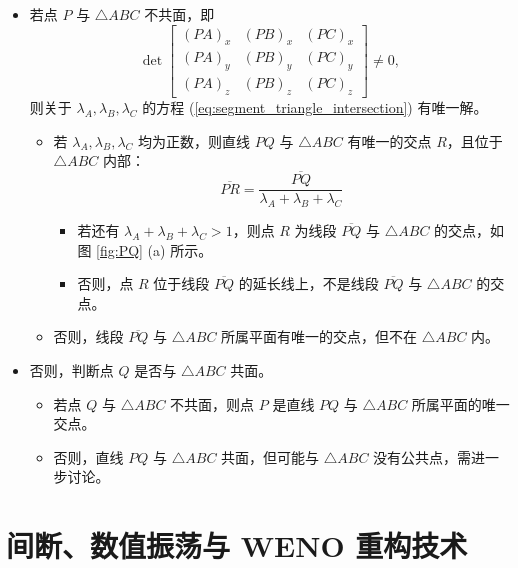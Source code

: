 \begin{itemize}
\item 若点 $P$ 与 $\triangle ABC$ 不共面，即
\begin{equation}
\det\begin{bmatrix}(PA)_{x} & (PB)_{x} & (PC)_{x}\\
(PA)_{y} & (PB)_{y} & (PC)_{y}\\
(PA)_{z} & (PB)_{z} & (PC)_{z}
\end{bmatrix}\ne0,
\end{equation}
则关于 $\lambda_{A},\lambda_{B},\lambda_{C}$ 的方程 (\ref{eq:segment_triangle_intersection})
有唯一解。
\begin{itemize}
\item 若 $\lambda_{A},\lambda_{B},\lambda_{C}$ 均为正数，则直线 $PQ$ 与 $\triangle ABC$
有唯一的交点 $R$，且位于 $\triangle ABC$ 内部：
\begin{equation}
\overline{PR}=\frac{\overline{PQ}}{\lambda_{A}+\lambda_{B}+\lambda_{C}}
\end{equation}

\begin{itemize}
\item 若还有 $\lambda_{A}+\lambda_{B}+\lambda_{C}>1$，则点 $R$ 为线段 $\overline{PQ}$
与 $\triangle ABC$ 的交点，如图 \ref{fig:PQ} (a) 所示。
\item 否则，点 $R$ 位于线段 $\overline{PQ}$ 的延长线上，不是线段 $\overline{PQ}$ 与 $\triangle ABC$
的交点。
\end{itemize}
\item 否则，线段 $\overline{PQ}$ 与 $\triangle ABC$ 所属平面有唯一的交点，但不在 $\triangle ABC$
内。
\end{itemize}
\item 否则，判断点 $Q$ 是否与 $\triangle ABC$ 共面。
\begin{itemize}
\item 若点 $Q$ 与 $\triangle ABC$ 不共面，则点 $P$ 是直线 $PQ$ 与 $\triangle ABC$
所属平面的唯一交点。
\item 否则，直线 $PQ$ 与 $\triangle ABC$ 共面，但可能与 $\triangle ABC$ 没有公共点，需进一步讨论。
\end{itemize}
\end{itemize}

\section{间断、数值振荡与 WENO 重构技术\label{sec:WENO}}

